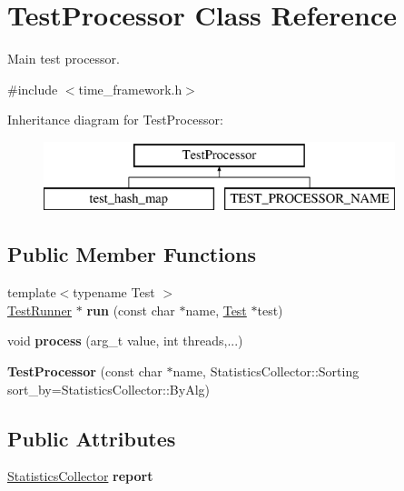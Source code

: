 \hypertarget{classTestProcessor}{}\section{Test\+Processor Class Reference}
\label{classTestProcessor}


Main test processor.  




{\ttfamily \#include $<$time\+\_\+framework.\+h$>$}

Inheritance diagram for Test\+Processor\+:\begin{figure}[H]
\begin{center}
\leavevmode
\includegraphics[height=2.000000cm]{classTestProcessor}
\end{center}
\end{figure}
\subsection*{Public Member Functions}
\begin{DoxyCompactItemize}
\item 
\hypertarget{classTestProcessor_a0baae6a0f600c9196991c4a1f8d6586d}{}{\footnotesize template$<$typename Test $>$ }\\\hyperlink{classTestRunner}{Test\+Runner} $\ast$ {\bfseries run} (const char $\ast$name, \hyperlink{classTest}{Test} $\ast$test)\label{classTestProcessor_a0baae6a0f600c9196991c4a1f8d6586d}

\item 
\hypertarget{classTestProcessor_af408cadfc40f05bb44d2ebb925d33e4b}{}void {\bfseries process} (arg\+\_\+t value, int threads,...)\label{classTestProcessor_af408cadfc40f05bb44d2ebb925d33e4b}

\item 
\hypertarget{classTestProcessor_ac3fb5d5cb7c17efcbc74088d022240a1}{}{\bfseries Test\+Processor} (const char $\ast$name, Statistics\+Collector\+::\+Sorting sort\+\_\+by=Statistics\+Collector\+::\+By\+Alg)\label{classTestProcessor_ac3fb5d5cb7c17efcbc74088d022240a1}

\end{DoxyCompactItemize}
\subsection*{Public Attributes}
\begin{DoxyCompactItemize}
\item 
\hypertarget{classTestProcessor_a4b93aa718702a0a69b4700f2c3dee6e4}{}\hyperlink{classStatisticsCollector}{Statistics\+Collector} {\bfseries report}\label{classTestProcessor_a4b93aa718702a0a69b4700f2c3dee6e4}

\end{DoxyCompactItemize}
